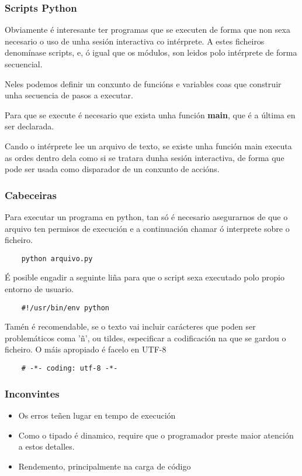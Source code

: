 \begin{frame}
  \frametitle{Scripts Python}
  Obviamente é interesante ter programas que se executen de forma que non sexa
  necesario o uso de unha sesión interactiva co intérprete. A estes ficheiros
  denomínase scripts, e, ó igual que os módulos, son leidos polo intérprete de
  forma secuencial.

  Neles podemos definir un conxunto de funcións e variables coas que construir
  unha secuencia de pasos a executar.

  Para que se execute é necesario que exista unha función \textbf{main}, que é a
  última en ser declarada.

  Cando o intérprete lee un arquivo de texto, se existe unha función main
  executa as ordes dentro dela como si se tratara dunha sesión interactiva, de
  forma que pode ser usada como disparador de un conxunto de accións.
\end{frame}

\begin{frame}[fragile]
  \frametitle{Cabeceiras}
  Para executar un programa en python, tan só é necesario asegurarnos de que o
  arquivo ten permisos de execución e a continuación chamar ó interprete sobre o
  ficheiro.
  \small
  \begin{verbatim}
    python arquivo.py
  \end{verbatim}
  \normalsize
  É posible engadir a seguinte liña para que o script sexa executado polo propio
  entorno de usuario.
  \small
  \begin{verbatim}
    #!/usr/bin/env python 
  \end{verbatim}
  \normalsize
  Tamén é recomendable, se o texto vai incluir carácteres que poden ser
  problemáticos coma 'ñ', ou tildes, especificar a codificación na que se gardou
  o ficheiro. O máis apropiado é facelo en UTF-8
  \begin{verbatim}
    # -*- coding: utf-8 -*-
  \end{verbatim}
  \normalsize
\end{frame}

\begin{frame}
  \frametitle{Inconvintes}
  \begin{itemize}
  \item Os erros teñen lugar en tempo de execución
  \item Como o tipado é dinamico, require que o programador preste maior
    atención a estos detalles.
  \item Rendemento, principalmente na carga de código
  \end{itemize}
\end{frame}

